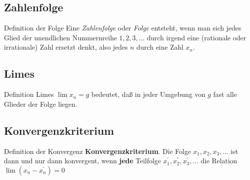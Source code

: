 \subsection{Zahlenfolge}
\begin{frame}{Definition der Folge}
Eine \emph{Zahlenfolge} oder \emph{Folge} entsteht, wenn man sich jedes Glied der 
unendlichen Nummernreihe $1,2,3,\ldots$ durch irgend eine (rationale oder irrationale) 
Zahl ersetzt denkt, also jedes $n$ durch eine Zahl $x_n$.
\end{frame}
\subsection{Limes}
\begin{frame}{Definition Limes}
$\lim x_n=g$ bedeutet, daß in jeder Umgebung von $g$ fast alle Glieder der Folge liegen.
\end{frame}
\subsection{Konvergenzkriterium}
\begin{frame}{Definition der Konvergenz}
\textbf{Konvergenzkriterium}. Die Folge $x_1,x_2,x_3,\ldots$ ist dann und nur dann 
konvergent, wenn \textbf{jede} Teilfolge $x^\prime_1,x^\prime_2, x^\prime_3,\ldots$ die 
Relation $\lim(x_n-x^\prime_n)=0$
\end{frame}

\endinput